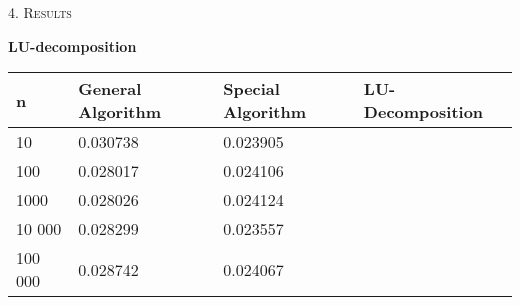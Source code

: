 \documentclass[a4paper,10pt]{article}
\begin{document}
\bigskip

\begin{center}
\textsc{4. Results}
\end{center}
 \textbf{LU-decomposition} \\



\begin{table}[]  \label{fig:5}
\begin{tabular}{llll}
\hline
n &General Algorithm  & Special Algorithm & LU-Decomposition \\
\hline
10 & 0.030738           & 0.023905          &                  \\
100 & 0.028017           & 0.024106          &                  \\
1000 & 0.028026           & 0.024124          &                  \\
10 000 & 0.028299           & 0.023557          &                  \\
100 000 & 0.028742           & 0.024067          &                  \\
\end{tabular}
\end{table}
\end{document}
